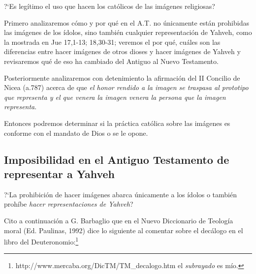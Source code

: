 \documentclass{article}
\begin{document}
?`Es leg\'{i}timo el uso que hacen los cat\'olicos de las im\'agenes religiosas?

Primero analizaremos c\'omo y por qu\'e en el A.T. no \'unicamente est\'an prohibidas las im\'agenes de los \'{i}dolos, sino tambi\'en cualquier representaci\'on de Yahveh, como la mostrada en Jue 17,1-13; 18,30-31; veremos el por qu\'e, cu\'ales son las diferencias entre hacer im\'agenes de otros dioses y hacer im\'agenes de Yahveh y revisaremos qu\'e de eso ha cambiado del Antiguo al Nuevo Testamento.

Posteriormente analizaremos con detenimiento la afirmaci\'on del II Concilio de Nicea (a.787) acerca de que \emph{el honor rendido a la imagen se traspasa al prototipo que representa y el que venera la imagen venera la persona que la imagen representa}.

Entonces podremos determinar si la pr\'actica cat\'olica sobre las im\'agenes es conforme con el mandato de Dios o se le opone.

\subsection{Imposibilidad en el Antiguo Testamento de representar a Yahveh}

?`La prohibici\'on de hacer im\'agenes abarca \'unicamente a los \'{i}dolos o tambi\'en proh\'{i}be \emph{hacer representaciones de Yahveh}?




Cito a continuaci\'on a G. Barbaglio que en el Nuevo Diccionario de Teolog\'{i}a moral (Ed. Paulinas, 1992) dice lo siguiente al comentar sobre el dec\'alogo en el libro del Deuteronomio:\footnote{http://www.mercaba.org/DicTM/TM\_decalogo.htm el \emph{subrayado} es m\'{i}o.}
\end{document}

